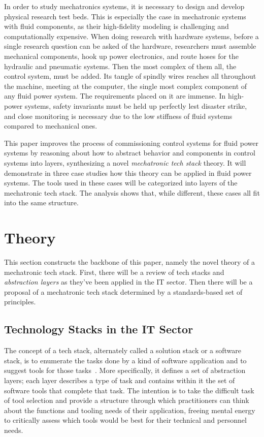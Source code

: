 \documentclass[english,12pt,a4paper,pdftex,eng,utf8]{aaltothesis}
\begin{document}
\thispagestyle{empty}

In order to study mechatronics systems, it is necessary to design and develop physical research test beds. This is especially the case in mechatronic systems with fluid components, as their high-fidelity modeling is challenging and computationally expensive. When doing research with hardware systems, before a single research question can be asked of the hardware, researchers must assemble mechanical components, hook up power electronics, and route hoses for the hydraulic and pneumatic systems. Then the most complex of them all, the control system, must be added. Its tangle of spindly wires reaches all throughout the machine, meeting at the computer, the single most complex component of any fluid power system. The requirements placed on it are immense. In high-power systems, safety invariants must be held up perfectly lest disaster strike, and close monitoring is necessary due to the low stiffness of fluid systems compared to mechanical ones.

This paper improves the process of commissioning control systems for fluid power systems by reasoning about how to abstract behavior and components in control systems into layers, synthesizing a novel {\it mechatronic tech stack\/} theory. It will demonstrate in three case studies how this theory can be applied in fluid power systems. The tools used in these cases will be categorized into layers of the mechatronic tech stack.  The analysis shows that, while different, these cases all fit into the same structure.

\clearpage


\section{Theory}

This section constructs the backbone of this paper, namely the novel theory of a mechatronic tech stack. First, there will be a review of tech stacks and {\it abstraction layers\/} as they've been applied in the IT sector. Then there will be a proposal of a mechatronic tech stack determined by a standards-based set of principles.

\subsection{Technology Stacks in the IT Sector}

The concept of a tech stack, alternately called a solution stack or a software stack, is to enumerate the tasks done by a kind of software application and to suggest tools for those tasks~\cite{PranamStack2017}. More specifically, it defines a set of abstraction layers; each layer describes a type of task and contains within it the set of software tools that complete that task. The intention is to take the difficult task of tool selection and provide a structure through which practitioners can think about the functions and tooling needs of their application, freeing mental energy to critically assess which tools would be best for their technical and personnel needs.
\end{document}
